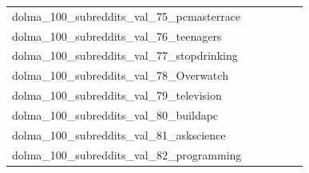 \documentclass[dvipsnames]{article}
\begin{document}
\begin{appendix}
{\begin{longtable}{m{6cm}m{1.7cm}m{1.7cm}m{1.7cm}m{1.7cm}m{1.7cm}}
	dolma\_100\_subreddits\_val\_75\_pcmasterrace  & \colorbox[HTML]{ffffe5}{\makebox[\mywidth][c]{23.73}} & \colorbox[HTML]{e2f3a9}{\makebox[\mywidth][c]{22.49}} & \colorbox[HTML]{ffffe5}{\makebox[\mywidth][c]{24.02}} & \colorbox[HTML]{edf8b2}{\makebox[\mywidth][c]{22.56}} & \colorbox[HTML]{77c578}{\makebox[\mywidth][c]{22.21}}\\
	dolma\_100\_subreddits\_val\_76\_teenagers  & \colorbox[HTML]{ffffe5}{\makebox[\mywidth][c]{18.37}} & \colorbox[HTML]{f8fcc3}{\makebox[\mywidth][c]{16.35}} & \colorbox[HTML]{fafdca}{\makebox[\mywidth][c]{16.44}} & \colorbox[HTML]{77c578}{\makebox[\mywidth][c]{15.56}} & \colorbox[HTML]{fefee0}{\makebox[\mywidth][c]{17.02}}\\
	dolma\_100\_subreddits\_val\_77\_stopdrinking  & \colorbox[HTML]{ffffe5}{\makebox[\mywidth][c]{21.08}} & \colorbox[HTML]{9dd687}{\makebox[\mywidth][c]{20.02}} & \colorbox[HTML]{ffffe5}{\makebox[\mywidth][c]{21.19}} & \colorbox[HTML]{e2f3a9}{\makebox[\mywidth][c]{20.17}} & \colorbox[HTML]{77c578}{\makebox[\mywidth][c]{19.98}}\\
	dolma\_100\_subreddits\_val\_78\_Overwatch  & \colorbox[HTML]{ffffe5}{\makebox[\mywidth][c]{30.47}} & \colorbox[HTML]{bbe395}{\makebox[\mywidth][c]{28.77}} & \colorbox[HTML]{ffffe5}{\makebox[\mywidth][c]{31.13}} & \colorbox[HTML]{f2fab5}{\makebox[\mywidth][c]{29.13}} & \colorbox[HTML]{77c578}{\makebox[\mywidth][c]{28.57}}\\
	dolma\_100\_subreddits\_val\_79\_television  & \colorbox[HTML]{ffffe5}{\makebox[\mywidth][c]{23.97}} & \colorbox[HTML]{c5e799}{\makebox[\mywidth][c]{22.63}} & \colorbox[HTML]{ffffe5}{\makebox[\mywidth][c]{24.05}} & \colorbox[HTML]{e5f4ab}{\makebox[\mywidth][c]{22.75}} & \colorbox[HTML]{77c578}{\makebox[\mywidth][c]{22.49}}\\
	dolma\_100\_subreddits\_val\_80\_buildapc  & \colorbox[HTML]{ffffe5}{\makebox[\mywidth][c]{21.55}} & \colorbox[HTML]{dcf1a5}{\makebox[\mywidth][c]{20.22}} & \colorbox[HTML]{ffffe5}{\makebox[\mywidth][c]{21.78}} & \colorbox[HTML]{e7f5ad}{\makebox[\mywidth][c]{20.29}} & \colorbox[HTML]{77c578}{\makebox[\mywidth][c]{19.98}}\\
	dolma\_100\_subreddits\_val\_81\_askscience  & \colorbox[HTML]{ffffe5}{\makebox[\mywidth][c]{17.25}} & \colorbox[HTML]{ecf7b1}{\makebox[\mywidth][c]{16.39}} & \colorbox[HTML]{ffffe5}{\makebox[\mywidth][c]{17.52}} & \colorbox[HTML]{e3f4aa}{\makebox[\mywidth][c]{16.34}} & \colorbox[HTML]{77c578}{\makebox[\mywidth][c]{16.11}}\\
	dolma\_100\_subreddits\_val\_82\_programming  & \colorbox[HTML]{ffffe5}{\makebox[\mywidth][c]{23.66}} & \colorbox[HTML]{eff8b3}{\makebox[\mywidth][c]{22.61}} & \colorbox[HTML]{ffffe5}{\makebox[\mywidth][c]{24.04}} & \colorbox[HTML]{e5f5ac}{\makebox[\mywidth][c]{22.55}} & \colorbox[HTML]{77c578}{\makebox[\mywidth][c]{22.24}}\\

\end{longtable}}
\end{appendix}
\end{document}
